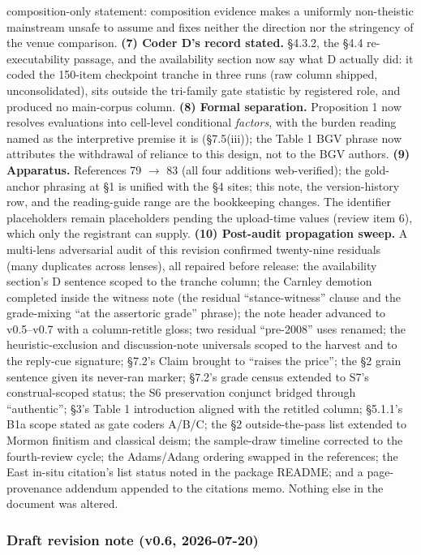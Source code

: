composition-only statement: composition evidence makes a uniformly non-theistic mainstream unsafe to assume and fixes neither the direction nor the stringency of the venue comparison. \textbf{(7) Coder D's record stated.} \S{}4.3.2, the \S{}4.4 re-executability passage, and the availability section now say what D actually did: it coded the 150-item checkpoint tranche in three runs (raw column shipped, unconsolidated), sits outside the tri-family gate statistic by registered role, and produced no main-corpus column. \textbf{(8) Formal separation.} Proposition 1 now resolves evaluations into cell-level conditional \emph{factors}, with the burden reading named as the interpretive premise it is (\S{}7.5(iii)); the Table 1 BGV phrase now attributes the withdrawal of reliance to this design, not to the BGV authors. \textbf{(9) Apparatus.} References 79 $\to$ 83 (all four additions web-verified); the gold-anchor phrasing at \S{}1 is unified with the \S{}4 sites; this note, the version-history row, and the reading-guide range are the bookkeeping changes. The identifier placeholders remain placeholders pending the upload-time values (review item 6), which only the registrant can supply. \textbf{(10) Post-audit propagation sweep.} A multi-lens adversarial audit of this revision confirmed twenty-nine residuals (many duplicates across lenses), all repaired before release: the availability section's D sentence scoped to the tranche column; the Carnley demotion completed inside the witness note (the residual ``stance-witness'' clause and the grade-mixing ``at the assertoric grade'' phrase); the note header advanced to v0.5--v0.7 with a column-retitle gloss; two residual ``pre-2008'' uses renamed; the heuristic-exclusion and discussion-note universals scoped to the harvest and to the reply-cue signature; \S{}7.2's Claim brought to ``raises the price''; the \S{}2 grain sentence given its never-ran marker; \S{}7.2's grade census extended to S7's construal-scoped status; the S6 preservation conjunct bridged through ``authentic''; \S{}3's Table 1 introduction aligned with the retitled column; \S{}5.1.1's B1a scope stated as gate coders A/B/C; the \S{}2 outside-the-pass list extended to Mormon finitism and classical deism; the sample-draw timeline corrected to the fourth-review cycle; the Adams/Adang ordering swapped in the references; the East in-situ citation's list status noted in the package README; and a page-provenance addendum appended to the citations memo. Nothing else in the document was altered.

\subsubsection{Draft revision note (v0.6, 2026-07-20)}\label{draft-revision-note-v0.6-2026-07-20}

